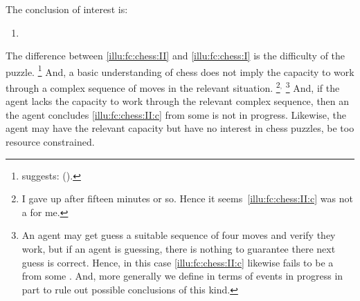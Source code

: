 \begin{note}[Chess II]
  \noindent%
  The conclusion of interest is:
  \begin{enumerate}[label=C\thescenarioCounter., ref=C\thescenarioCounter]
  \item
    \label{illu:fc:chess:II:c}
  \end{enumerate}
  The difference between \autoref{illu:fc:chess:II} and \autoref{illu:fc:chess:I} is the difficulty of the puzzle.%
  \footnote{
    \citeauthor{Emms:2000aa} suggests:
    (\citeyear[46]{Emms:2000aa}).
  }
  And, a basic understanding of chess does not imply the capacity to work through a complex sequence of moves in the relevant situation.%
  \footnote{
    I gave up after fifteen minutes or so.
    Hence it seems~\ref{illu:fc:chess:II:c} was not a \fc{} for me.
  }\(^{,}\)%
  \footnote{
    An agent may get guess a suitable sequence of four moves and verify they work, but if an agent is guessing, there is nothing to guarantee there next guess is correct.
    Hence, in this case \ref{illu:fc:chess:II:c} likewise fails to be a \fc{} from some \pool{}.
    And, more generally we define  in terms of events in progress in part to rule out possible conclusions of this kind.
  }
  And, if the agent lacks the capacity to work through the relevant complex sequence, then an  the agent concludes \ref{illu:fc:chess:II:c} from some \pool{} is not in progress.
  Likewise, the agent may have the relevant capacity but have no interest in chess puzzles, be too resource constrained.
\end{note}


